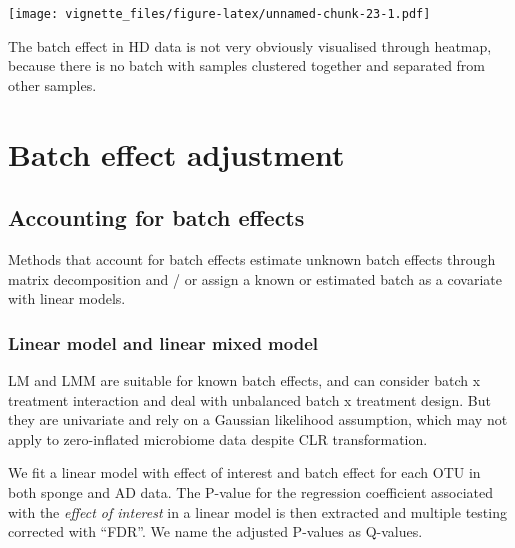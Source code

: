 \documentclass[]{book}
\begin{document}
\texttt{[image: vignette\_files/figure-latex/unnamed-chunk-23-1.pdf]}

The batch effect in HD data is not very obviously visualised through
heatmap, because there is no batch with samples clustered together and
separated from other samples.

\chapter{Batch effect adjustment}\label{adjust}

\section{Accounting for batch
effects}\label{accounting-for-batch-effects}

Methods that account for batch effects estimate unknown batch effects
through matrix decomposition and / or assign a known or estimated batch
as a covariate with linear models.

\subsection{Linear model and linear mixed
model}\label{linear-model-and-linear-mixed-model}

LM and LMM are suitable for known batch effects, and can consider batch
x treatment interaction and deal with unbalanced batch x treatment
design. But they are univariate and rely on a Gaussian likelihood
assumption, which may not apply to zero-inflated microbiome data despite
CLR transformation.

We fit a linear model with effect of interest and batch effect for each
OTU in both sponge and AD data. The P-value for the regression
coefficient associated with the \emph{effect of interest} in a linear
model is then extracted and multiple testing corrected with ``FDR''. We
name the adjusted P-values as Q-values.
\end{document}
